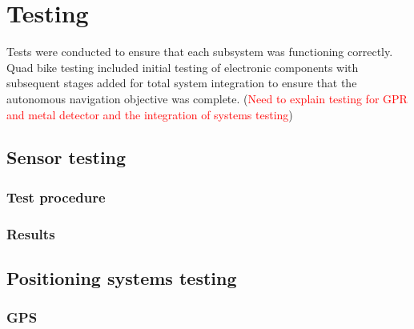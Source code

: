 \documentclass[main.tex]{subfiles}
\begin{document}
\chapter{Testing}
Tests were conducted to ensure that each subsystem was functioning correctly. Quad bike testing included initial testing of electronic components with subsequent stages added for total system integration to ensure that the autonomous navigation objective was complete.
(\textcolor{red}{Need to explain testing for GPR and metal detector and the integration of systems testing})

\section{Sensor testing}
\subsection{Test procedure}
\subsection{Results}

\section{Positioning systems testing}
\subsection{GPS}
\end{document}
